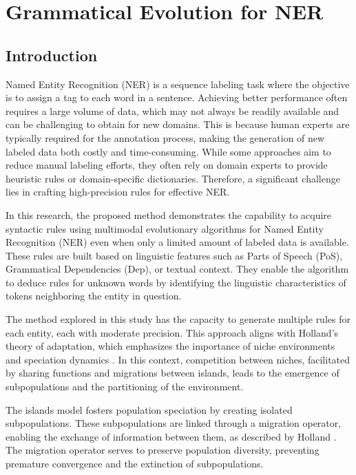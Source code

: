 \chapter{Grammatical Evolution for NER}

\section{Introduction}

Named Entity Recognition (NER) is a sequence labeling task where the objective is to assign a tag to each word in a sentence. Achieving better performance often requires a large volume of data, which may not always be readily available and can be challenging to obtain for new domains. This is because human experts are typically required for the annotation process, making the generation of new labeled data both costly and time-consuming. While some approaches aim to reduce manual labeling efforts, they often rely on domain experts to provide heuristic rules or domain-specific dictionaries. Therefore, a significant challenge lies in crafting high-precision rules for effective NER\cite{ma-etal-2022-label, Huang2020FewShotNE, Shang2018, Fries2017, Safranchik2020, Lison2020}.

In this research, the proposed method demonstrates the capability to acquire syntactic rules using multimodal evolutionary algorithms for Named Entity Recognition (NER) even when only a limited amount of labeled data is available. These rules are built based on linguistic features such as Parts of Speech (PoS), Grammatical Dependencies (Dep), or textual context. They enable the algorithm to deduce rules for unknown words by identifying the linguistic characteristics of tokens neighboring the entity in question.

The method explored in this study has the capacity to generate multiple rules for each entity, each with moderate precision. This approach aligns with Holland's theory of adaptation, which emphasizes the importance of niche environments and speciation dynamics \cite{holland-1992-adaptation}. In this context, competition between niches, facilitated by sharing functions and migrations between islands, leads to the emergence of subpopulations and the partitioning of the environment.

The islands model fosters population speciation by creating isolated subpopulations. These subpopulations are linked through a migration operator, enabling the exchange of information between them, as described by Holland \cite{holland-1992-adaptation}. The migration operator serves to preserve population diversity, preventing premature convergence and the extinction of subpopulations.

